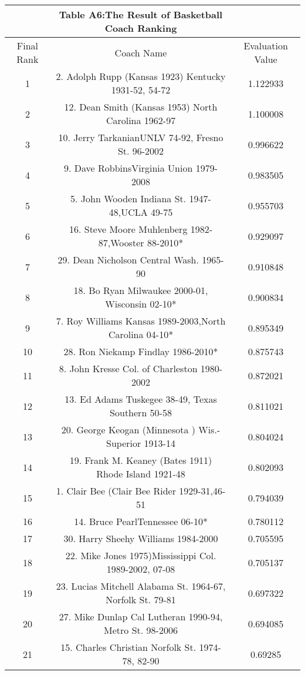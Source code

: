 \documentclass{mcmthesis}
\begin{document}
\begin{appendices}
\begin{longtable}{ccc}
 &Table A6:The Result of Basketball Coach Ranking&\\
 \hline
Final Rank & Coach Name & Evaluation Value\\
\hline
\endhead
1     & 2. Adolph Rupp (Kansas 1923) Kentucky 1931-52, 54-72 & 1.122933 \\
    2     & 12. Dean Smith (Kansas 1953) North Carolina 1962-97 & 1.100008 \\
    3     & 10. Jerry TarkanianUNLV 74-92, Fresno St. 96-2002  & 0.996622 \\
    4     & 9. Dave RobbinsVirginia Union 1979-2008 & 0.983505 \\
    5     & 5. John Wooden Indiana St. 1947-48,UCLA 49-75  & 0.955703 \\
    6     & 16. Steve Moore Muhlenberg 1982-87,Wooster 88-2010* & 0.929097 \\
    7     & 29. Dean Nicholson Central Wash. 1965-90  & 0.910848 \\
    8     & 18. Bo Ryan Milwaukee 2000-01, Wisconsin 02-10*  & 0.900834 \\
    9     & 7. Roy Williams  Kansas 1989-2003,North Carolina 04-10* & 0.895349 \\
    10    & 28. Ron Niekamp  Findlay 1986-2010* & 0.875743 \\
    11    & 8. John Kresse Col. of Charleston 1980-2002 & 0.872021 \\
    12    & 13. Ed Adams Tuskegee 38-49, Texas Southern 50-58 & 0.811021 \\
    13    & 20. George Keogan (Minnesota ) Wis.-Superior 1913-14& 0.804024 \\
    14    & 19. Frank M. Keaney (Bates 1911) Rhode Island 1921-48 & 0.802093 \\
    15    & 1. Clair Bee (Clair Bee Rider 1929-31,46-51 & 0.794039 \\
    16    & 14. Bruce PearlTennessee 06-10* & 0.780112 \\
    17    & 30. Harry Sheehy Williams 1984-2000  & 0.705595 \\
    18    & 22. Mike Jones 1975)Mississippi Col. 1989-2002, 07-08 & 0.705137 \\
    19    & 23. Lucias Mitchell Alabama St. 1964-67, Norfolk St. 79-81 & 0.697322 \\
    20    & 27. Mike Dunlap Cal Lutheran 1990-94, Metro St. 98-2006 & 0.694085 \\
    21    & 15. Charles Christian Norfolk St. 1974-78, 82-90 & 0.69285 \\

\end{longtable}
\end{appendices}
\end{document}
